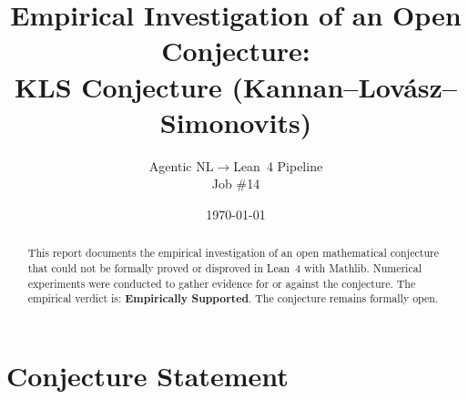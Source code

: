 \documentclass[11pt]{article}
\title{Empirical Investigation of an Open Conjecture:\\
KLS Conjecture (Kannan–Lovász–Simonovits)}
\author{Agentic NL$\to$Lean~4 Pipeline \\ \small Job \#14}
\date{\today}
\begin{document}
\maketitle

\begin{abstract}
This report documents the empirical investigation of an open mathematical conjecture
that could not be formally proved or disproved in Lean~4 with Mathlib.
Numerical experiments were conducted to gather evidence for or against the conjecture.
The empirical verdict is: \textbf{\textcolor{green!70!black}{Empirically Supported}}.
The conjecture remains formally open.
\end{abstract}

\section{Conjecture Statement}
\end{document}
